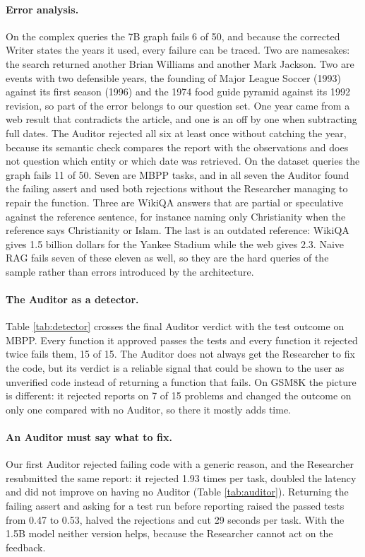\documentclass{article}
\begin{document}
\paragraph{Error analysis.}
On the complex queries the 7B graph fails 6 of 50, and because the corrected Writer states the years it used, every failure can be traced. Two are namesakes: the search returned another Brian Williams and another Mark Jackson. Two are events with two defensible years, the founding of Major League Soccer (1993) against its first season (1996) and the 1974 food guide pyramid against its 1992 revision, so part of the error belongs to our question set. One year came from a web result that contradicts the article, and one is an off by one when subtracting full dates. The Auditor rejected all six at least once without catching the year, because its semantic check compares the report with the observations and does not question which entity or which date was retrieved. On the dataset queries the graph fails 11 of 50. Seven are MBPP tasks, and in all seven the Auditor found the failing assert and used both rejections without the Researcher managing to repair the function. Three are WikiQA answers that are partial or speculative against the reference sentence, for instance naming only Christianity when the reference says Christianity or Islam. The last is an outdated reference: WikiQA gives 1.5 billion dollars for the Yankee Stadium while the web gives 2.3. Naive RAG fails seven of these eleven as well, so they are the hard queries of the sample rather than errors introduced by the architecture.



\paragraph{The Auditor as a detector.}
Table \ref{tab:detector} crosses the final Auditor verdict with the test outcome on MBPP. Every function it approved passes the tests and every function it rejected twice fails them, 15 of 15. The Auditor does not always get the Researcher to fix the code, but its verdict is a reliable signal that could be shown to the user as unverified code instead of returning a function that fails. On GSM8K the picture is different: it rejected reports on 7 of 15 problems and changed the outcome on only one compared with no Auditor, so there it mostly adds time.



\paragraph{An Auditor must say what to fix.}
Our first Auditor rejected failing code with a generic reason, and the Researcher resubmitted the same report: it rejected 1.93 times per task, doubled the latency and did not improve on having no Auditor (Table \ref{tab:auditor}). Returning the failing assert and asking for a test run before reporting raised the passed tests from 0.47 to 0.53, halved the rejections and cut 29 seconds per task. With the 1.5B model neither version helps, because the Researcher cannot act on the feedback.
\end{document}
